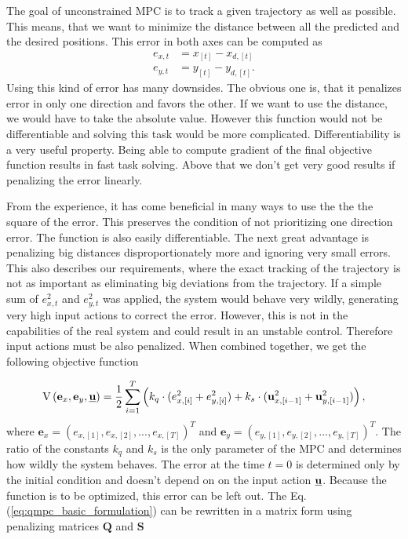 \documentclass[a4paper,11pt,titlepage]{article}
\newcommand{\uvec}{\textbf{\underline{u}}}
\begin{document}
The goal of unconstrained MPC is to track a given trajectory as well as possible. This means, that we want to minimize the distance between all the predicted and the desired positions. This error in both axes can be computed as
\begin{equation}
\begin{split}
\label{eq:simple_err}
e_{x, t} &= x_{[t]} - x_{d, [t]}\\
e_{y, t} &= y_{[t]} - y_{d, [t]}.
\end{split}
\end{equation}
Using this kind of error has many downsides. The obvious one is, that it penalizes error in only one direction and favors the other. If we want to use the distance, we would have to take the absolute value. However this function would not be differentiable \cite{stein1970singular} and solving this task would be more complicated. Differentiability is a very useful property. Being able to compute gradient of the final objective function results in fast task solving. Above that we don't get very good results if penalizing the error linearly. 

From the experience, it has come beneficial in many ways to use the the the square of the error. This preserves the condition of not prioritizing one direction error. The function is also easily differentiable. The next great advantage is penalizing big distances disproportionately more and ignoring very small errors. This also describes our requirements, where the exact tracking of the trajectory is not as important as eliminating big deviations from the trajectory. If a simple sum of $e_{x, t}^2$ and $e_{y, t}^2$ was applied, the system would behave very wildly, generating very high input actions to correct the error. However, this is not in the capabilities of the real system and could result in an unstable control. Therefore input actions must be also penalized. When combined together, we get the following objective function 

\begin{equation}
\label{eq:qmpc_basic_formulation}
\mathrm{V}\left(\textbf{e}_x, \textbf{e}_y, \uvec\right) 
= \frac{1}{2}\sum_{i=1}^{T}\left( k_q \cdot (e^2_{x, [i]}+e^2_{y, [i]}) + k_s \cdot (\textbf{u}^2_{x, [i-1]}+\textbf{u}^2_{y, [i-1]})\right),
\end{equation}
where $\textbf{e}_x = (e_{x, [1]}, e_{x, [2]}, ..., e_{x, [T]})^T$ and $\textbf{e}_y = (e_{y, [1]}, e_{y, [2]}, ..., e_{y, [T]})^T$. The ratio of the constants $k_q$ and $k_s$ is the only parameter of the MPC and determines how wildly the system behaves. The error at the time $t = 0$ is determined only by the initial condition and doesn't depend on on the input action $\uvec$. Because the function is to be optimized, this error can be left out. The Eq. (\ref{eq:qmpc_basic_formulation}) can be rewritten in a matrix form using penalizing matrices $\textbf{Q}$ and $\textbf{S}$
\end{document}
